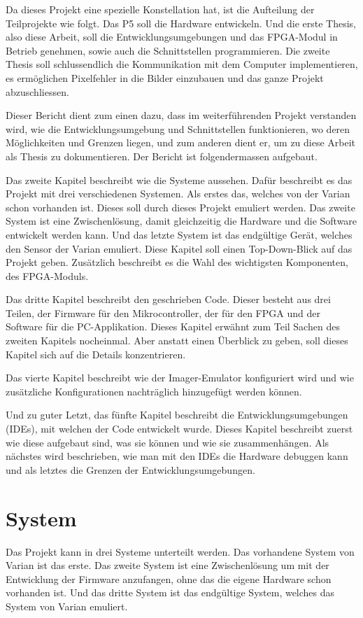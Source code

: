 \documentclass{article}
\begin{document}
Da dieses Projekt eine spezielle Konstellation hat, ist die Aufteilung der Teilprojekte wie folgt. Das P5 soll die Hardware entwickeln. Und die erste Thesis, also diese Arbeit, soll die Entwicklungsumgebungen und das FPGA-Modul in Betrieb genehmen, sowie auch die Schnittstellen programmieren. Die zweite Thesis soll schlussendlich die Kommunikation mit dem Computer implementieren, es ermöglichen Pixelfehler in die Bilder einzubauen und das ganze Projekt abzuschliessen.

Dieser Bericht dient zum einen dazu, dass im weiterführenden Projekt verstanden wird, wie die Entwicklungsumgebung und Schnittstellen funktionieren, wo deren Möglichkeiten und Grenzen liegen, und zum anderen dient er, um zu diese Arbeit als Thesis zu dokumentieren. Der Bericht ist folgendermassen aufgebaut.

Das zweite Kapitel beschreibt wie die Systeme aussehen. Dafür beschreibt es das Projekt mit drei verschiedenen Systemen. Als erstes das, welches von der Varian schon vorhanden ist. Dieses soll durch dieses Projekt emuliert werden. Das zweite System ist eine Zwischenlösung, damit gleichzeitig die Hardware und die Software entwickelt werden kann. Und das letzte System ist das endgültige Gerät, welches den Sensor der Varian emuliert. Diese Kapitel soll einen Top-Down-Blick auf das Projekt geben. Zusätzlich beschreibt es die Wahl des wichtigsten Komponenten, des FPGA-Moduls.

Das dritte Kapitel beschreibt den geschrieben Code. Dieser besteht aus drei Teilen, der Firmware für den Mikrocontroller, der für den FPGA und der Software für die PC-Applikation. Dieses Kapitel erwähnt zum Teil Sachen des zweiten Kapitels nocheinmal. Aber anstatt einen Überblick zu geben, soll dieses Kapitel sich auf die Details konzentrieren.

Das vierte Kapitel beschreibt wie der Imager-Emulator konfiguriert wird und wie zusätzliche Konfigurationen nachträglich hinzugefügt werden können.

Und zu guter Letzt, das fünfte Kapitel beschreibt die Entwicklungsumgebungen (IDEs), mit welchen der Code entwickelt wurde. Dieses Kapitel beschreibt zuerst wie diese aufgebaut sind, was sie können und wie sie zusammenhängen. Als nächstes wird beschrieben, wie man mit den IDEs die Hardware debuggen kann und als letztes die Grenzen der Entwicklungsumgebungen.

\section{System}
Das Projekt kann in drei Systeme unterteilt werden. Das vorhandene System von Varian ist das erste. Das zweite System ist eine Zwischenlösung um mit der Entwicklung der Firmware anzufangen, ohne das die eigene Hardware schon vorhanden ist. Und das dritte System ist das endgültige System, welches das System von Varian emuliert.
\end{document}
